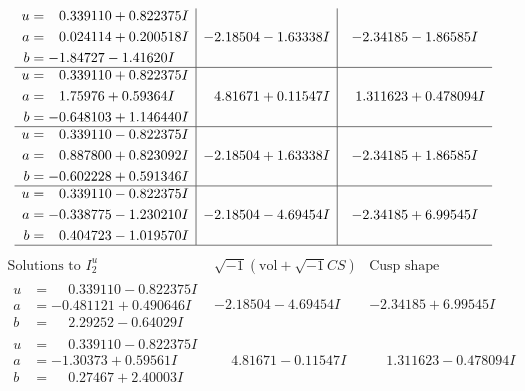 \documentclass[1p]{elsarticle_modified}
\theoremstyle{definition}
\newcommand{\I}{\sqrt{-1}}
\begin{document}
$$\begin{array}{c|c|c}
\begin{aligned}
u &= \phantom{-}0.339110 + 0.822375 I \\
a &= \phantom{-}0.024114 + 0.200518 I \\
b &= -1.84727 - 1.41620 I\end{aligned}
 & -2.18504 - 1.63338 I & -2.34185 - 1.86585 I \\ \hline\begin{aligned}
u &= \phantom{-}0.339110 + 0.822375 I \\
a &= \phantom{-}1.75976 + 0.59364 I \\
b &= -0.648103 + 1.146440 I\end{aligned}
 & \phantom{-}4.81671 + 0.11547 I & \phantom{-}1.311623 + 0.478094 I \\ \hline\begin{aligned}
u &= \phantom{-}0.339110 - 0.822375 I \\
a &= \phantom{-}0.887800 + 0.823092 I \\
b &= -0.602228 + 0.591346 I\end{aligned}
 & -2.18504 + 1.63338 I & -2.34185 + 1.86585 I \\ \hline\begin{aligned}
u &= \phantom{-}0.339110 - 0.822375 I \\
a &= -0.338775 - 1.230210 I \\
b &= \phantom{-}0.404723 - 1.019570 I\end{aligned}
 & -2.18504 - 4.69454 I & -2.34185 + 6.99545 I\\
 \hline 
 \end{array}$$\newpage$$\begin{array}{c|c|c}  
\text{Solutions to }I^u_{2}& \I (\text{vol} + \sqrt{-1}CS) & \text{Cusp shape}\\
 \hline 
\begin{aligned}
u &= \phantom{-}0.339110 - 0.822375 I \\
a &= -0.481121 + 0.490646 I \\
b &= \phantom{-}2.29252 - 0.64029 I\end{aligned}
 & -2.18504 - 4.69454 I & -2.34185 + 6.99545 I \\ \hline\begin{aligned}
u &= \phantom{-}0.339110 - 0.822375 I \\
a &= -1.30373 + 0.59561 I \\
b &= \phantom{-}0.27467 + 2.40003 I\end{aligned}
 & \phantom{-}4.81671 - 0.11547 I & \phantom{-}1.311623 - 0.478094 I \\ \hline\begin{aligned}

\end{aligned}
\end{array}$$
\end{document}
